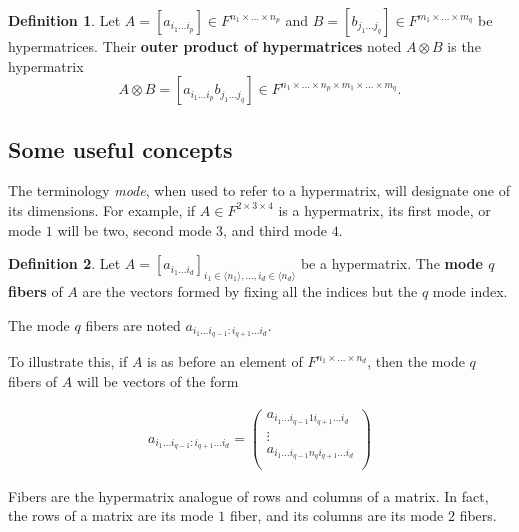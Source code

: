 \documentclass{report}
\theoremstyle{definition}
\newtheorem{defin}{Definition}
\theoremstyle{remark}
\begin{document}
\begin{defin}
        Let $A = [a_{i_1 \dots i_p}] \in F^{n_1 \times \dots \times n_p} $ and $B = [b_{j_1 \dots j_q}] \in F^{m_1 \times \dots \times m_q} $ be hypermatrices.
        Their \textbf{outer product of hypermatrices} noted $A \otimes B$ is the hypermatrix
        \begin{equation*}
                A \otimes B = [a_{i_1 \dots i_p}b_{j_1 \dots j_q}] \in F^{n_1 \times \dots \times n_p \times m_1 \times \dots \times m_q}.
        \end{equation*}
\end{defin}

\subsection{Some useful concepts}

The terminology \textit{mode}, when used to refer to a hypermatrix, will designate one of its dimensions. For example, if $A \in F^{2 \times 3 \times 4}$ is  a hypermatrix, its first mode, or mode $1$ will be two, second mode $3$, and third mode $4$.

\begin{defin}
        Let $A = [a_{i_1 \dots i_d}]_{i_1 \in \langle n_1 \rangle , \dots, i_d \in \langle n_d \rangle}$ be a hypermatrix. The \textbf{mode $q$ fibers} of $A$ are the vectors formed by fixing all the indices but the $q$ mode index.
\end{defin}

The mode $q$ fibers are noted $a_{i_1 \dots i_{q-1}:i_{q +1}\dots i_d}$.

To illustrate this, if $A$ is as before an element of $F^{n_1 \times \dots \times n_d}$, then the mode $q$ fibers of $A$ will be vectors of the form

\begin{equation*}
        \begin{split}
            a_{i_1\dots i_{q-1}:i_{q+1}\dots i_d} = 
            \begin{pmatrix}
            a_{i_1\dots i_{q-1}1 i_{q+1}\dots i_d} \\
            \vdots \\
            a_{i_1\dots i_{q-1}n_q i_{q+1}\dots i_d} \\
            \end{pmatrix}
        \end{split}
\end{equation*}

Fibers are the hypermatrix analogue of rows and columns of a matrix. In fact, the rows of a matrix are its mode $1$ fiber, and its columns are its mode $2$ fibers.
\end{document}
